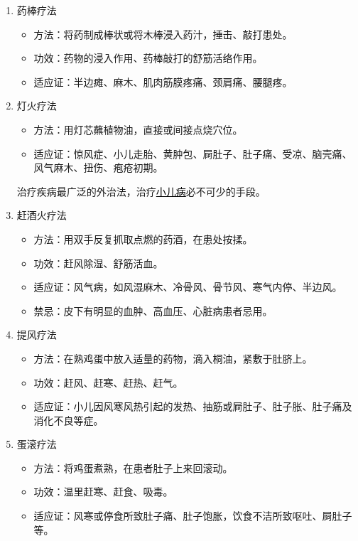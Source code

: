 \documentclass[cn,black,12pt,normal,founder]{elegantnote}
\newcommand{\redt}[1]{\textcolor{black}{{}#1}}      %
\begin{document}
\begin{enumerate}
  \item 药棒疗法
  \begin{itemize}
    \item 方法：将药制成棒状或将木棒浸入药汁，捶击、敲打患处。
    \item 功效：药物的浸入作用、药棒敲打的舒筋活络作用。
    \item 适应证：半边瘫、麻木、肌肉筋膜疼痛、颈肩痛、腰腿疼。
  \end{itemize}
  \item 灯火疗法
  \begin{itemize}
    \item 方法：用灯芯蘸植物油，直接或间接点烧穴位。
    \item 适应证：惊风症、小儿走胎、黄肿包、屙肚子、肚子痛、受凉、脑壳痛、风气麻木、扭伤、疱疮初期。
  \end{itemize}
  \begin{note}
  治疗疾病最广泛的外治法，治疗\redt{\uline{小儿病}}必不可少的手段。
  \end{note}
  \item 赶酒火疗法
  \begin{itemize}
    \item 方法：用双手反复抓取点燃的药酒，在患处按揉。
    \item 功效：赶风除湿、舒筋活血。
    \item 适应证：风气病，如风湿麻木、冷骨风、骨节风、寒气内停、半边风。
    \item \redt{禁忌：}皮下有明显的血肿、高血压、心脏病患者忌用。
  \end{itemize}
  \item 提风疗法
  \begin{itemize}
    \item 方法：在熟鸡蛋中放入适量的药物，滴入桐油，紧敷于肚脐上。
    \item 功效：赶风、赶寒、赶热、赶气。
    \item 适应证：小儿因风寒风热引起的发热、抽筋或屙肚子、肚子胀、肚子痛及消化不良等症。
  \end{itemize}
  \item 蛋滚疗法
  \begin{itemize}
    \item 方法：将鸡蛋煮熟，在患者肚子上来回滚动。
    \item 功效：温里赶寒、赶食、吸毒。
    \item 适应证：风寒或停食所致肚子痛、肚子饱胀，饮食不洁所致呕吐、屙肚子等。

\end{itemize}
\end{enumerate}
\end{document}
